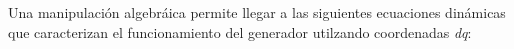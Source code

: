 






Una manipulación algebráica permite llegar a las siguientes ecuaciones dinámicas que caracterizan el funcionamiento 
del generador utilzando coordenadas \emph{dq}:


